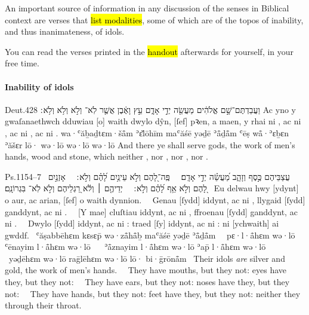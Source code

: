 \begin{paper}
	An important source of information in any discussion of the senses in Biblical context are verses that \hl{list modalities}, some of which are of the topos of inability, and thus inanimateness, of idols.

	You can read the verses printed in the \hl{handout} afterwards for yourself, in your free time.
\end{paper}



\paragraph{Inability of idols}

\begin{example}{Deut.}{4}{28}{}{}
	\quoling
	{וַעֲבַדְתֶּם־שָׁ֣ם אֱלֹהִ֔ים מַעֲשֵׂ֖ה יְדֵ֣י אָדָ֑ם עֵ֣ץ וָאֶ֔בֶן אֲשֶׁ֤ר לֹֽא־ וְלֹ֣א  וְלֹ֥א  וְלֹ֥א ׃}
	{Ac yno y gwaſanaethwch dduwiau [o] waith dwylo dŷn, [ſef] pꝛen, a maen, y rhai ni , ac ni , ac ni , ac ni .}
	{wa·ʿăḇaḏtɛm·šå̄m ʾɛ̆lōhīm maʿăśē yəḏē ʾå̄ḏå̄m ʿēṣ wå̄·ʾɛḇɛn ʾăšɛr lō· wə·lō  wə·lō  wə·lō }
	{And there ye shall serve gods, the work of men’s hands, wood and stone, which neither , nor , nor , nor .}
\end{example}

\begin{example}{Ps.}{115}{4–7}{}{}
	\quoling
	{%
		~עֲצַבֵּיהֶם כֶּ֣סֶף וְזָהָ֑ב מַ֝עֲשֵׂ֗ה יְדֵ֣י אָדָֽם׃\ %
		~פֶּֽה־לָ֭הֶם וְלֹ֣א  עֵינַ֥יִם לָ֝הֶ֗ם וְלֹ֣א ׃\ %
		~אָזְנַ֣יִם לָ֭הֶם וְלֹ֣א  אַ֥ף לָ֝הֶ֗ם וְלֹ֣א ׃\ %
		~יְדֵיהֶ֤ם ׀ וְלֹ֬א  רַ֭גְלֵיהֶם וְלֹ֣א  לֹֽא־ בִּגְרוֹנָֽם׃
	}
	{%
		~Eu delwau hwy [ydynt] o aur, ac arian, [ſef] o waith dynnion.\ %
		~Genau [ſydd] iddynt, ac ni , llygaid [ſydd] ganddynt, ac ni .\ %
		~[Y mae] cluſtiau iddynt, ac ni , ffroenau [ſydd] ganddynt, ac ni .\ %
		~Dwylo [ſydd] iddynt, ac ni : traed [ſy] iddynt, ac ni : ni  [ychwaith] ai gwddf.
	}
	{%
		~ʿăṣabbēhɛm kɛsɛp̄ wə·zå̄hå̄ḇ maʿăśē yəḏē ʾå̄ḏå̄m\ %
		~pɛ·l·å̄hɛm wə·lō  ʿēnayim l·å̄hɛm wə·lō \ %
		~ʾå̄znayim l·å̄hɛm wə·lō  ʾap̄ l·å̄hɛm wə·lō \ %
		~yəḏēhɛm wə·lō  raḡlēhɛm wə·lō  lō· bi·ḡrōnå̄m
	}
	{%
		~Their idols \textit{are} silver and gold, the work of men’s hands.\ %
		~They have mouths, but they  not: eyes have they, but they  not:\ %
		~They have ears, but they  not: noses have they, but they  not:\ %
		~They have hands, but they  not: feet have they, but they  not: neither  they through their throat.
	}
\end{example}

